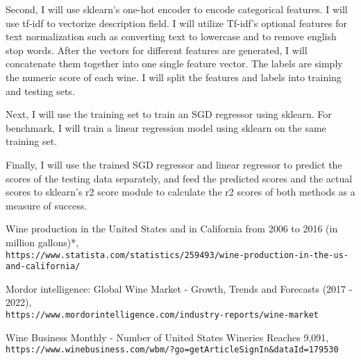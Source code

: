\documentclass{article}
\begin{document}
Second, I will use sklearn's one-hot encoder to encode categorical features. I will use tf-idf to vectorize description field. I will utilize Tf-idf's optional features for text normalization such as converting text to lowercase and to remove english stop words. After the vectors for different features are generated, I will concatenate them together into one single feature vector. The labels are simply the numeric score of each wine. I will split the features and labels into training and testing sets.

Next, I will use the training set to train an SGD regressor using sklearn. For benchmark, I will train a linear regression model using sklearn on the same training set.

Finally, I will use the trained SGD regressor and linear regressor to predict the scores of the testing data separately, and feed the predicted scores and the actual scores to sklearn's r2 score module to calculate the r2 scores of both methods as a measure of success.

\begin{thebibliography}{9}
 
Wine production in the United States and in California from 2006 to 2016 (in million gallons)*,
\\\texttt{https://www.statista.com/statistics/259493/wine-production-in-the-us-and-california/}

Mordor intelligence: Global Wine Market - Growth, Trends and Forecasts (2017 - 2022),
\\\texttt{https://www.mordorintelligence.com/industry-reports/wine-market}

Wine Business Monthly - Number of United States Wineries Reaches 9,091,
\\\texttt{https://www.winebusiness.com/wbm/?go=getArticleSignIn\&dataId=179530}

\end{thebibliography}
\end{document}
